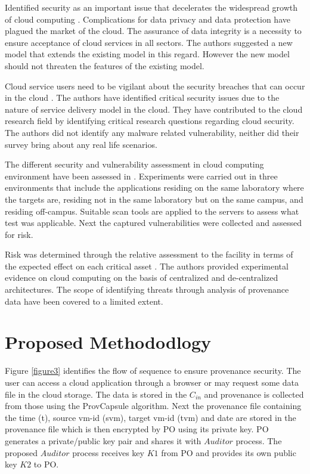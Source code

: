 \documentclass[conference]{IEEEtran}
\begin{document}
Identified security as an important issue that decelerates the widespread growth of cloud computing \cite{abbadi2011challenges}. Complications for data privacy and data protection have plagued the market of the cloud. The assurance of data integrity is a necessity to ensure acceptance of cloud services in all sectors. The authors suggested a new model that extends the existing model in this regard. However the new model should not threaten the features of the existing model.

Cloud service users need to be vigilant about the security breaches that can occur in the cloud \cite{abbadi2011challenges}. The authors have identified critical security issues due to the nature of service delivery model in the cloud. They have contributed to the cloud research field by identifying critical research questions regarding cloud security. The authors did not identify any malware related vulnerability, neither did their survey bring about any real life scenarios.

The different security and vulnerability assessment in cloud computing environment have been assessed in \cite{ko2011flogger}. Experiments were carried out in three environments that include the applications residing on the same laboratory where the targets are, residing not in the same laboratory but on the same campus, and residing off-campus. Suitable scan tools are applied to the servers to assess what test was applicable. Next the captured vulnerabilities were collected and assessed for risk.

Risk was determined through the relative assessment to the facility in terms of the expected effect on each critical asset \cite{ko2011flogger}. The authors provided experimental evidence on cloud computing on the basis of centralized and de-centralized architectures. The scope of identifying threats through analysis of provenance data have been covered to a limited extent.

\section{Proposed Methododlogy}
Figure \ref{figure3} identifies the flow of sequence to ensure provenance security. The user can access a cloud application through a browser or may request some data file in the cloud storage. The data is stored in the $C_{in}$ and provenance is collected from those using the ProvCapsule algorithm. Next the provenance file containing the time (t), source vm-id (svm), target vm-id (tvm) and date are stored in the provenance file which is then encrypted by PO using its private key. PO generates a private/public key pair and shares it with $Auditor$ process. The proposed $Auditor$ process receives key $K1$ from PO and provides its own public key $K2$ to PO.
\end{document}
